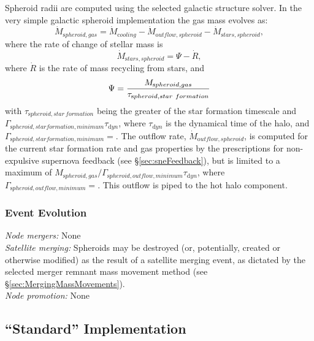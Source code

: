 Spheroid radii are computed using the selected galactic structure solver. In the very simple galactic spheroid implementation the gas mass evolves as:
\begin{equation}
 \dot{M}_{\mathrm spheroid, gas} = \dot{M}_{\mathrm cooling} - \dot{M}_{\mathrm outflow, spheroid} - \dot{M}_{\mathrm stars, spheroid},
\end{equation}
where the rate of change of stellar mass is
\begin{equation}
 \dot{M}_{\mathrm stars, spheroid} = \Psi - \dot{R},
\end{equation}
where $\dot{R}$ is the rate of mass recycling from stars, and
\begin{equation}
 \Psi = {M_{\mathrm spheroid, gas} \over \tau_{\mathrm spheroid, star~formation}}
\end{equation}
with $\tau_{\mathrm spheroid, star~formation}$ being the greater of the star formation timescale and $\Gamma_{\mathrm spheroid, star formation, minimum} \tau_{\mathrm dyn}$, where $\tau_{\mathrm dyn}$ is the dynamical time of the halo, and $\Gamma_{\mathrm spheroid, star formation, minimum}=${\normalfont \ttfamily [spheroidStarFormationTimescaleMinimum]}. The outflow rate, $\dot{M}_{\mathrm outflow, spheroid}$, is computed for the current star formation rate and gas properties by the prescriptions for non-expulsive supernova feedback (see \S\ref{sec:sneFeedback}), but is limited to a maximum of $M_{\mathrm spheroid, gas}/ \Gamma_{\mathrm spheroid, outflow, minimum} \tau_{\mathrm dyn}$, where $\Gamma_{\mathrm spheroid, outflow, minimum}=${\normalfont \ttfamily [spheroidOutflowTimescaleMinimum]}. This outflow is piped to the hot halo component.

\subsubsection{Event Evolution}

\noindent\emph{Node mergers:} None\\

\noindent\emph{Satellite merging:} Spheroids may be destroyed (or, potentially, created or otherwise modified) as the result of a satellite merging event, as dictated by the selected merger remnant mass movement method (see \S\ref{sec:MergingMassMovements}).\\

\noindent\emph{Node promotion:} None\\

\subsection{``Standard'' Implementation}

